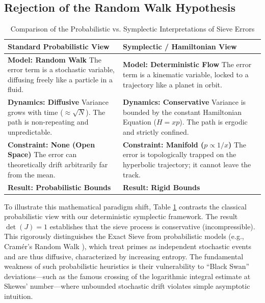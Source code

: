 \documentclass[sn-mathphys-num, pdflatex, referee]{sn-jnl}
\begin{document}
\subsection{Rejection of the Random Walk Hypothesis}
\begin{table}[ht]
\small
\centering
\caption{Comparison of the Probabilistic vs. Symplectic Interpretations of Sieve Errors}
\label{tab:comparison}
\renewcommand{\arraystretch}{1.2}
\setlength{\tabcolsep}{36pt}
\begin{tabular}{|>{\raggedright\arraybackslash}p{3cm}|>{\raggedright\arraybackslash}p{3cm}|}
\toprule
\textbf{Standard Probabilistic View} & \textbf{Symplectic / Hamiltonian View} \\
\midrule
\textbf{Model: Random Walk} \newline The error term is a stochastic variable, diffusing freely like a particle in a fluid. & \textbf{Model: Deterministic Flow} \newline The error term is a kinematic variable, locked to a trajectory like a planet in orbit. \\
\midrule
\textbf{Dynamics: Diffusive} \newline Variance grows with time ($\approx \sqrt{N}$). The path is non-repeating and unpredictable. & \textbf{Dynamics: Conservative} \newline Variance is bounded by the constant Hamiltonian Equation ($H=xp$). The path is ergodic and strictly confined. \\
\midrule
\textbf{Constraint: None (Open Space)} \newline The error can theoretically drift arbitrarily far from the mean. & \textbf{Constraint: Manifold ($p \propto 1/x$)} \newline The error is topologically trapped on the hyperbolic trajectory; it cannot leave the track. \\
\midrule
\textbf{Result: Probabilistic Bounds} & \textbf{Result: Rigid Bounds} \\
\bottomrule
\end{tabular}
\end{table}

To illustrate this mathematical paradigm shift, Table \ref{tab:comparison} contrasts the classical probabilistic view with our deterministic symplectic framework. The result $\det(J) = 1$ establishes that the sieve process is conservative (incompressible). This rigorously distinguishes the Exact Sieve from probabilistic models (e.g., Cram\'{e}r's Random Walk \cite{cramer1936order}), which treat primes as independent stochastic events and are thus diffusive, characterized by increasing entropy. The fundamental weakness of such probabilistic heuristics is their vulnerability to ``Black Swan'' deviations---such as the famous crossing of the logarithmic integral estimate at Skewes' number---where unbounded stochastic drift violates simple asymptotic intuition.
\end{document}

